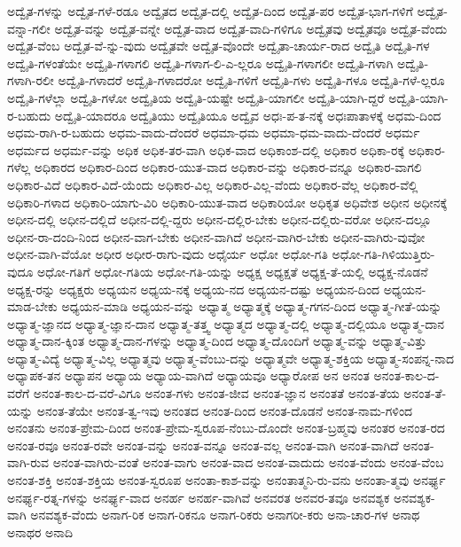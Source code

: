 {ಅದ್ವೈತ-ಗಳನ್ನು
ಅದ್ವೈತ-ಗಳೆ-ರಡೂ
ಅದ್ವೈತದ
ಅದ್ವೈತ-ದಲ್ಲಿ
ಅದ್ವೈತ-ದಿಂದ
ಅದ್ವೈತ-ಪರ
ಅದ್ವೈತ-ಭಾಗ-ಗಳಿಗೆ
ಅದ್ವೈತ-ವನ್ನಾ-ಗಲೀ
ಅದ್ವೈತ-ವನ್ನು
ಅದ್ವೈತ-ವನ್ನೇ
ಅದ್ವೈತ-ವಾದ
ಅದ್ವೈತ-ವಾದಿ-ಗಳಿಗೂ
ಅದ್ವೈತವು
ಅದ್ವೈತವೂ
ಅದ್ವೈತ-ವೆಂದು
ಅದ್ವೈತ-ವೆಂಬ
ಅದ್ವೈತ-ವೆ-ನ್ನು-ವುದು
ಅದ್ವೈತವೇ
ಅದ್ವೈತ-ವೊಂದೇ
ಅದ್ವೈತಾ-ಚಾರ್ಯ-ರಾದ
ಅದ್ವೈತಿ
ಅದ್ವೈತಿ-ಗಳ
ಅದ್ವೈತಿ-ಗಳಂತೆಯೇ
ಅದ್ವೈತಿ-ಗಳಾಗಲಿ
ಅದ್ವೈತಿ-ಗಳಾಗ-ಲಿ-ಎ-ಲ್ಲರೂ
ಅದ್ವೈತಿ-ಗಳಾಗಲೀ
ಅದ್ವೈತಿ-ಗಳಾಗಿ
ಅದ್ವೈತಿ-ಗಳಾಗಿ-ರಲೀ
ಅದ್ವೈತಿ-ಗಳಾದರೆ
ಅದ್ವೈತಿ-ಗಳಾದರೋ
ಅದ್ವೈತಿ-ಗಳಿಗೆ
ಅದ್ವೈತಿ-ಗಳು
ಅದ್ವೈತಿ-ಗಳೂ
ಅದ್ವೈತಿ-ಗಳೆ-ಲ್ಲರೂ
ಅದ್ವೈತಿ-ಗಳೆಲ್ಲಾ
ಅದ್ವೈತಿ-ಗಳೋ
ಅದ್ವೈತಿಯ
ಅದ್ವೈತಿ-ಯಷ್ಟೇ
ಅದ್ವೈತಿ-ಯಾಗಲೀ
ಅದ್ವೈತಿ-ಯಾಗಿ-ದ್ದರೆ
ಅದ್ವೈತಿ-ಯಾಗಿ-ರ-ಬಹುದು
ಅದ್ವೈತಿ-ಯಾದರೂ
ಅದ್ವೈತಿಯು
ಅದ್ವೈತಿಯೂ
ಅದ್ವೈವ
ಅಧಃ-ಪ-ತ-ನಕ್ಕೆ
ಅಧಃಪಾತಾಳಕ್ಕೆ
ಅಧಮ-ದಿಂದ
ಅಧಮ-ರಾಗಿ-ರ-ಬಹುದು
ಅಧಮ-ವಾದು-ದೆಂದರೆ
ಅಧಮಾ-ಧಮ
ಅಧಮಾ-ಧಮ-ವಾದು-ದೆಂದರೆ
ಅಧರ್ಮ
ಅಧರ್ಮದ
ಅಧರ್ಮ-ವನ್ನು
ಅಧಿಕ
ಅಧಿಕ-ತರ-ವಾಗಿ
ಅಧಿಕ-ವಾದ
ಅಧಿಕಾಂಶ-ದಲ್ಲಿ
ಅಧಿಕಾರ
ಅಧಿಕಾ-ರಕ್ಕೆ
ಅಧಿಕಾರ-ಗಳೆಲ್ಲ
ಅಧಿಕಾರದ
ಅಧಿಕಾರ-ದಿಂದ
ಅಧಿಕಾರ-ಯುತ-ವಾದ
ಅಧಿಕಾರ-ವನ್ನು
ಅಧಿಕಾರ-ವನ್ನೂ
ಅಧಿಕಾರ-ವಾಗಲಿ
ಅಧಿಕಾರ-ವಿದೆ
ಅಧಿಕಾರ-ವಿದೆ-ಯೆಂದು
ಅಧಿಕಾರ-ವಿಲ್ಲ
ಅಧಿಕಾರ-ವಿಲ್ಲ-ವೆಂದು
ಅಧಿಕಾರ-ವೆಲ್ಲ
ಅಧಿಕಾರ-ವೆಲ್ಲಿ
ಅಧಿಕಾರಿ-ಗಳಾದ
ಅಧಿಕಾರಿ-ಯಾಗು-ವಿರಿ
ಅಧಿಕಾರಿ-ಯುತ-ವಾದ
ಅಧಿಕಾರಿಯೋ
ಅಧಿಕೃತ
ಅಧಿವೇಶ
ಅಧೀನ
ಅಧೀನಕ್ಕೆ
ಅಧೀನ-ದಲ್ಲಿ
ಅಧೀನ-ದಲ್ಲಿದೆ
ಅಧೀನ-ದಲ್ಲಿ-ದ್ದರು
ಅಧೀನ-ದಲ್ಲಿರ-ಬೇಕು
ಅಧೀನ-ದಲ್ಲಿರು-ವರೋ
ಅಧೀನ-ದಲ್ಲೂ
ಅಧೀನ-ರಾ-ದಂದಿ-ನಿಂದ
ಅಧೀನ-ವಾಗ-ಬೇಕು
ಅಧೀನ-ವಾಗಿದೆ
ಅಧೀನ-ವಾಗಿರ-ಬೇಕು
ಅಧೀನ-ವಾಗಿರು-ವುವೋ
ಅಧೀನ-ವಾಗಿ-ವೆಯೋ
ಅಧೀರ
ಅಧೀರ-ರಾಗು-ವುದು
ಅಧೈರ್ಯ
ಅಧೋ
ಅಧೋ-ಗತಿ
ಅಧೋ-ಗತಿ-ಗಿಳಿಯುತ್ತಿರು-ವುದೂ
ಅಧೋ-ಗತಿಗೆ
ಅಧೋ-ಗತಿಯ
ಅಧೋ-ಗತಿ-ಯನ್ನು
ಅಧ್ಯಕ್ಷ
ಅಧ್ಯಕ್ಷತೆ
ಅಧ್ಯಕ್ಷ-ತೆ-ಯಲ್ಲಿ
ಅಧ್ಯಕ್ಷ-ನೊಡನೆ
ಅಧ್ಯಕ್ಷ-ರನ್ನು
ಅಧ್ಯಕ್ಷರು
ಅಧ್ಯಯನ
ಅಧ್ಯಯ-ನಕ್ಕೆ
ಅಧ್ಯಯ-ನದ
ಅಧ್ಯಯನ-ದಷ್ಟು
ಅಧ್ಯಯನ-ದಿಂದ
ಅಧ್ಯಯನ-ಮಾಡ-ಬೇಕು
ಅಧ್ಯಯನ-ಮಾಡಿ
ಅಧ್ಯಯನ-ವನ್ನು
ಅಧ್ಯಾತ್ಮ
ಅಧ್ಯಾತ್ಮಕ್ಕೆ
ಅಧ್ಯಾತ್ಮ-ಗಗನ-ದಿಂದ
ಅಧ್ಯಾತ್ಮ-ಗೀತೆ-ಯನ್ನು
ಅಧ್ಯಾತ್ಮ-ಜ್ಞಾನದ
ಅಧ್ಯಾತ್ಮ-ಜ್ಞಾನ-ದಾನ
ಅಧ್ಯಾತ್ಮ-ತತ್ತ್ವ
ಅಧ್ಯಾತ್ಮದ
ಅಧ್ಯಾತ್ಮ-ದಲ್ಲಿ
ಅಧ್ಯಾತ್ಮ-ದಲ್ಲಿಯೂ
ಅಧ್ಯಾತ್ಮ-ದಾನ
ಅಧ್ಯಾತ್ಮ-ದಾನ-ಕ್ಕಿಂತ
ಅಧ್ಯಾತ್ಮ-ದಾನ-ಗಳನ್ನು
ಅಧ್ಯಾತ್ಮ-ದಿಂದ
ಅಧ್ಯಾತ್ಮ-ದೊಂದಿಗೆ
ಅಧ್ಯಾತ್ಮ-ವನ್ನು
ಅಧ್ಯಾತ್ಮ-ವಿತ್ತು
ಅಧ್ಯಾತ್ಮ-ವಿದ್ಯೆ
ಅಧ್ಯಾತ್ಮ-ವಿಲ್ಲ
ಅಧ್ಯಾತ್ಮವು
ಅಧ್ಯಾತ್ಮ-ವೆಂಬು-ದನ್ನು
ಅಧ್ಯಾತ್ಮವೇ
ಅಧ್ಯಾತ್ಮ-ಶಕ್ತಿಯ
ಅಧ್ಯಾತ್ಮ-ಸಂಪನ್ನ-ನಾದ
ಅಧ್ಯಾಪಕ-ತನ
ಅಧ್ಯಾಪನ
ಅಧ್ಯಾಯ
ಅಧ್ಯಾಯ-ವಾಗಿದೆ
ಅಧ್ಯಾಯವೂ
ಅಧ್ಯಾರೋಪ
ಅನ
ಅನಂತ
ಅನಂತ-ಕಾಲ-ದ-ವರೆಗೆ
ಅನಂತ-ಕಾಲ-ದ-ವರೆ-ವಿಗೂ
ಅನಂತ-ಗಳು
ಅನಂತ-ಜೀವ
ಅನಂತ-ಜ್ಞಾನ
ಅನಂತತೆ
ಅನಂತ-ತೆಯ
ಅನಂತ-ತೆ-ಯನ್ನು
ಅನಂತ-ತೆಯೇ
ಅನಂತ-ತ್ವ-ಇವು
ಅನಂತದ
ಅನಂತ-ದಿಂದ
ಅನಂತ-ದೊಡನೆ
ಅನಂತ-ನಾಮ-ಗಳಿಂದ
ಅನಂತನು
ಅನಂತ-ಪ್ರೇಮ-ದಿಂದ
ಅನಂತ-ಪ್ರೇಮ-ಸ್ವರೂಪ-ನೆಂಬು-ದೊಂದೇ
ಅನಂತ-ಬ್ರಹ್ಮವು
ಅನಂತರ
ಅನಂತ-ರದ
ಅನಂತ-ರವೂ
ಅನಂತ-ರವೇ
ಅನಂತ-ವನ್ನು
ಅನಂತ-ವನ್ನೂ
ಅನಂತ-ವಲ್ಲ
ಅನಂತ-ವಾಗಿ
ಅನಂತ-ವಾಗಿದೆ
ಅನಂತ-ವಾಗಿ-ರುವ
ಅನಂತ-ವಾಗಿರು-ವಂತೆ
ಅನಂತ-ವಾಗು
ಅನಂತ-ವಾದ
ಅನಂತ-ವಾದುದು
ಅನಂತ-ವೆಂದು
ಅನಂತ-ವೆಂಬ
ಅನಂತ-ಶಕ್ತಿ
ಅನಂತ-ಶಕ್ತಿಯ
ಅನಂತ-ಸ್ವರೂಪ
ಅನಂತಾ-ಕಾಶ-ವನ್ನು
ಅನಂತಾತ್ಮನಿ-ರು-ವನು
ಅನಂತಾ-ತ್ಮವು
ಅನರ್ಘ್ಯ
ಅನರ್ಘ್ಯ-ರತ್ನ-ಗಳನ್ನು
ಅನರ್ಘ್ಯ-ವಾದ
ಅನರ್ಹ
ಅನರ್ಹ-ವಾಗಿವೆ
ಅನವರತ
ಅನವರ-ತವೂ
ಅನವಶ್ಯಕ
ಅನವಶ್ಯಕ-ವಾಗಿ
ಅನವಶ್ಯಕ-ವೆಂದು
ಅನಾಗ-ರಿಕ
ಅನಾಗ-ರಿಕನೂ
ಅನಾಗ-ರಿಕರು
ಅನಾಗರೀ-ಕರು
ಅನಾ-ಚಾರ-ಗಳ
ಅನಾಥ
ಅನಾಥರ
ಅನಾದಿ
}
